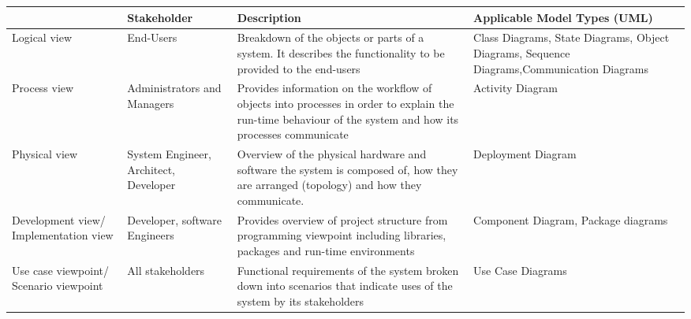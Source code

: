 \begin{sidewaystable}[h]
\centering
\begin{tabularx}{\textwidth}{X X X X}
\hline
\rowcolor[HTML]{C0C0C0} 
\multicolumn{1}{|X|}{\cellcolor[HTML]{C0C0C0}\textbf{Viewpoint}} & \multicolumn{1}{X|}{\cellcolor[HTML]{C0C0C0}\textbf{Stakeholder}} & \multicolumn{1}{X|}{\cellcolor[HTML]{C0C0C0}\textbf{Description}}                                                                                                              & \multicolumn{1}{X|}{\cellcolor[HTML]{C0C0C0}\textbf{Applicable Model Types (UML)}}                             \\ \hline
\multicolumn{1}{|X|}{Logical view}                               & \multicolumn{1}{X|}{End-Users}                                    & \multicolumn{1}{X|}{Breakdown of the objects or parts of a system. It describes the functionality to be provided to the end-users}                                             & \multicolumn{1}{X|}{Class Diagrams, State Diagrams, Object Diagrams, Sequence Diagrams,Communication Diagrams} \\ \hline
\multicolumn{1}{|X|}{Process view}                               & \multicolumn{1}{X|}{Administrators and Managers}                  & \multicolumn{1}{X|}{Provides information on the workflow of objects into processes in order to explain the run-time behaviour of the system and how its processes communicate} & \multicolumn{1}{X|}{Activity Diagram}                                                                          \\ \hline
\multicolumn{1}{|X|}{Physical view}                              & \multicolumn{1}{X|}{System Engineer, Architect, Developer}        & \multicolumn{1}{X|}{Overview of the physical hardware and software the system is composed of, how they are arranged (topology) and how they communicate.}                      & \multicolumn{1}{X|}{Deployment Diagram}                                                                        \\ \hline
\multicolumn{1}{|X|}{Development view/ Implementation view}      & \multicolumn{1}{X|}{Developer, software Engineers}                & \multicolumn{1}{X|}{Provides overview of project structure from programming viewpoint including libraries, packages and run-time environments}                                 & \multicolumn{1}{X|}{Component Diagram, Package diagrams}                                                       \\ \hline
\multicolumn{1}{|X|}{Use case viewpoint/ Scenario viewpoint}     & \multicolumn{1}{X|}{All stakeholders}                             & \multicolumn{1}{X|}{Functional requirements of the system broken down into scenarios that indicate uses of the system by its stakeholders}                                     & \multicolumn{1}{X|}{Use Case Diagrams}                                                                         \\ \hline

\end{tabularx}
\end{sidewaystable}
